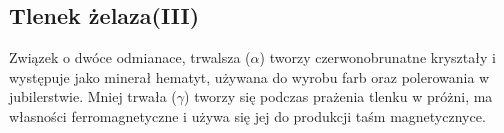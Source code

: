 \subsection{Tlenek żelaza(III) }
Związek o dwóce odmianace, trwalsza ($\alpha$) tworzy czerwonobrunatne kryształy i występuje jako minerał hematyt, używana do wyrobu farb oraz polerowania w jubilerstwie.
Mniej trwała ($\gamma$) tworzy się podczas prażenia tlenku  w próżni, ma własności ferromagnetyczne i używa się jej do produkcji taśm magnetycznyce.

